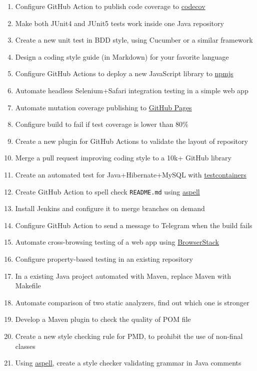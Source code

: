 \documentclass[nobrand,anonymous,nodate,nosecurity]{huawei}
\begin{document}
{\begin{enumerate}
	\item Configure GitHub Action to publish code coverage to \href{https://www.codecov.io}{codecov}
	\item Make both JUnit4 and JUnit5 tests work inside one Java repository
	\item Create a new unit test in BDD style, using Cucumber or a similar framework
	\item Design a coding style guide (in Markdown) for your favorite language
	\item Configure GitHub Actions to deploy a new JavaScript library to \href{https://npmjs.org}{npmjs}
	\item Automate headless Selenium+Safari integration testing in a simple web app
	\item Automate mutation coverage publishing to \href{https://pages.github.com}{GitHub Pages}
	\item Configure build to fail if test coverage is lower than 80\%
	\item Create a new plugin for GitHub Actions to validate the layout of repository
	\item Merge a pull request improving coding style to a 10k+ GitHub library
	\item Create an automated test for Java+Hibernate+MySQL with \href{https://www.testcontainers.org}{testcontainers}
	\item Create GitHub Action to spell check \texttt{README.md} using \href{http://aspell.net}{aspell}
	\item Install Jenkins and configure it to merge branches on demand
	\item Configure GitHub Action to send a message to Telegram when the build fails
	\item Automate cross-browsing testing of a web app using \href{https://www.browserstack.com}{BrowserStack}
	\item Configure property-based testing in an existing repository
	\item In a existing Java project automated with Maven, replace Maven with Makefile
	\item Automate comparison of two static analyzers, find out which one is stronger
	\item Develop a Maven plugin to check the quality of POM file
	\item Create a new style checking rule for PMD, to prohibit the use of non-final classes
	\item Using \href{http://aspell.net}{aspell}, create a style checker validating grammar in Java comments
\end{enumerate}

}
\end{document}
